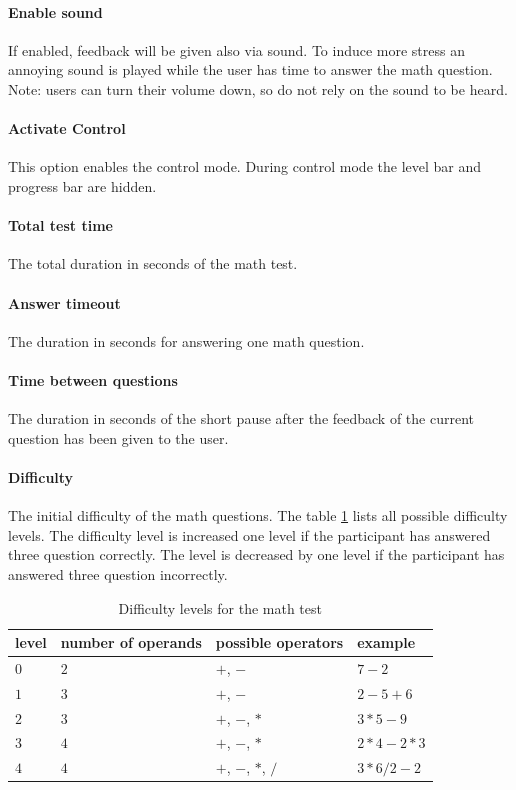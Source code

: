 \paragraph{Enable sound}
If enabled, feedback will be given also via sound. 
To induce more stress an annoying sound is played while the user has time to answer the math question.
Note: users can turn their volume down, so do not rely on the sound to be heard.

\paragraph{Activate Control}
This option enables the control mode.
During control mode the level bar and progress bar are hidden.

\paragraph{Total test time}
The total duration in seconds of the math test.

\paragraph{Answer timeout}
The duration in seconds for answering one math question.

\paragraph{Time between questions}
The duration in seconds of the short pause after the feedback of the current question has been given to the user.

\paragraph{Difficulty}
The initial difficulty of the math questions.
The table \ref{tab:math-test-difficulty} lists all possible difficulty levels.
The difficulty level is increased one level if the participant has answered three question correctly.
The level is decreased by one level if the participant has answered three question incorrectly.

\begin{table}[ht]
  \begin{tabularx}{\textwidth}{l|l|l|l}
    level & number of operands & possible operators & example \\
    \hline
    $0$ & $2$ & $+$, $-$ & $7-2$ \\
    $1$ & $3$ & $+$, $-$ & $2-5+6$ \\
    $2$ & $3$ & $+$, $-$, $*$ & $3*5-9$ \\
    $3$ & $4$ & $+$, $-$, $*$ & $2*4-2*3$ \\
    $4$ & $4$ & $+$, $-$, $*$, $/$ & $3*6/2-2$ \\
  \end{tabularx}
  \caption{Difficulty levels for the math test}
  \label{tab:math-test-difficulty}
\end{table}

